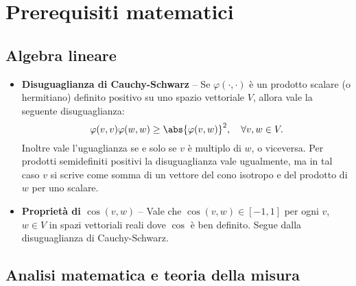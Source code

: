 \chapter*{Prerequisiti matematici}
\setlength{\parindent}{2pt}

\begin{multicols*}{2}

\section*{Algebra lineare}

\begin{itemize}
    \item \textbf{Disuguaglianza di Cauchy-Schwarz} -- Se $\varphi(\cdot, \cdot)$
    è un prodotto scalare (o hermitiano) definito positivo su uno spazio vettoriale $V$, allora vale la seguente disuguaglianza:
    \[
        \varphi(v, v) \varphi(w, w) \geq \abs{\varphi(v, w)}^2 , \quad \forall v, w \in V.
    \]
    Inoltre vale l'uguaglianza se e solo se $v$ è multiplo di $w$, o viceversa. Per
    prodotti semidefiniti positivi la disuguaglianza vale ugualmente, ma in
    tal caso $v$ si scrive come somma di un vettore del cono isotropo e del prodotto di $w$ per uno scalare. 
    \item \textbf{Proprietà di $\cos(v, w)$} -- Vale che $\cos(v, w) \in [-1, 1]$ per
    ogni $v$, $w \in V$ in spazi vettoriali reali dove $\cos$ è ben definito. Segue
    dalla disuguaglianza di Cauchy-Schwarz.
\end{itemize}

\section*{Analisi matematica e teoria della misura}


\end{multicols*}
